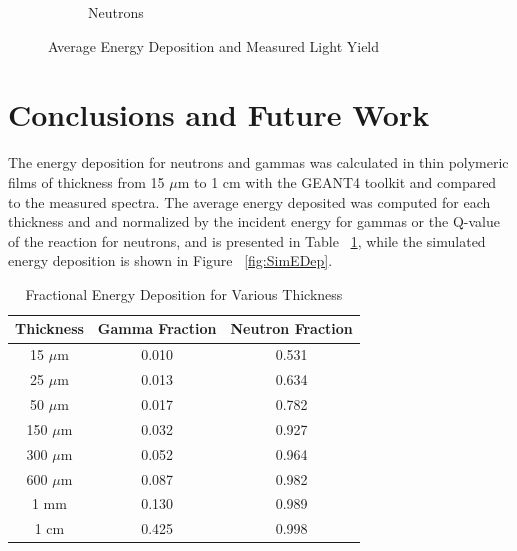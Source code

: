 \documentclass{anstrans}
\newcommand{\figurewidth}{0.45\textwidth}
\newcommand{\micron}{$\mu$m }
\begin{document}
\begin{figure}[!ht]
\begin{subfigure}[b]{\figurewidth}
		\caption{Neutrons}
	\end{subfigure}%
	\caption{Average Energy Deposition and Measured Light Yield}
	\label{fig:EDepLightYield}
\end{figure}
\section{Conclusions and Future Work}
The energy deposition for neutrons and gammas was calculated in thin polymeric films of thickness from 15 \micron to 1 cm with the GEANT4 toolkit and compared to the measured spectra.
The average energy deposited was computed for each thickness and and normalized by the incident energy for gammas or the Q-value of the reaction for neutrons, and is presented in Table ~\ref{tab:FractionEDep}, while the simulated energy deposition is shown in Figure ~\ref{fig:SimEDep}.
\begin{table}[!htb]
    \caption{Fractional Energy Deposition for Various Thickness}
	\centering
	\begin{tabular}{c | c c}
	Thickness & Gamma Fraction & Neutron Fraction \\
	\hline
	\hline
	15 \micron & 0.010 & 0.531 \\
	25 \micron & 0.013 & 0.634 \\
	50 \micron & 0.017 & 0.782 \\
	150 \micron & 0.032 & 0.927 \\
	300 \micron & 0.052 & 0.964 \\
	600 \micron & 0.087 & 0.982 \\
	1 mm & 0.130 & 0.989 \\
	1 cm & 0.425 & 0.998 \\
	\hline
	\end{tabular}
    \label{tab:FractionEDep}
\end{table}
\end{document}
